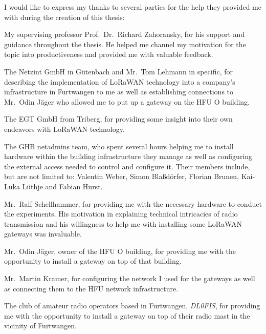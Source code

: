 I would like to express my thanks to several parties for the help they provided me with during the creation of this thesis:

My supervising professor Prof.\ Dr.\ Richard Zahoransky, for his support and guidance throughout the thesis.
He helped me channel my motivation for the topic into productiveness and provided me with valuable feedback.

The Netzint GmbH in Gütenbach and Mr.\ Tom Lehmann in specific, for describing the implementation of \ac{LoRaWAN} technology into a company's infrastructure in Furtwangen to me as well as establishing connections to Mr.\ Odin Jäger who allowed me to put up a gateway on the \ac{HFU} O building.

The EGT GmbH from Triberg, for providing some insight into their own endeavors with \ac{LoRaWAN} technology.

The \ac{GHB} netadmins team, who spent several hours helping me to install hardware within the building infrastructure they manage as well as configuring the external access needed to control and configure it.
Their members include, but are not limited to: Valentin Weber, Simon Blaßdörfer, Florian Brunen, Kai-Luka Lüthje and Fabian Hurst.

Mr.\ Ralf Schellhammer, for providing me with the necessary hardware to conduct the experiments.
His motivation in explaining technical intricacies of radio transmission and his willingness to help me with installing some \ac{LoRaWAN} gateways was invaluable.

Mr.\ Odin Jäger, owner of the \ac{HFU} O building, for providing me with the opportunity to install a gateway on top of that building.

Mr.\ Martin Kramer, for configuring the network I used for the gateways as well as connecting them to the \ac{HFU} network infrastructure.

The club of amateur radio operators based in Furtwangen, \emph{DL0FIS}, for providing me with the opportunity to install a gateway on top of their radio mast in the vicinity of Furtwangen.